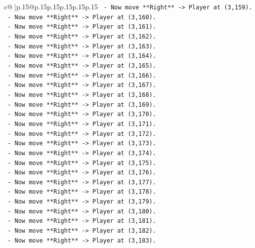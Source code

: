 \documentclass{article}
\begin{document}
{\begin{supertabular}{c@{$\;$}|p{.15\linewidth}@{}p{.15\linewidth}p{.15\linewidth}p{.15\linewidth}p{.15\linewidth}p{.15\linewidth}}
{{{\texttt{    {-}   Now move **Right** {-}> Player at (3,159).} \\
\texttt{    {-}   Now move **Right** {-}> Player at (3,160).} \\
\texttt{    {-}   Now move **Right** {-}> Player at (3,161).} \\
\texttt{    {-}   Now move **Right** {-}> Player at (3,162).} \\
\texttt{    {-}   Now move **Right** {-}> Player at (3,163).} \\
\texttt{    {-}   Now move **Right** {-}> Player at (3,164).} \\
\texttt{    {-}   Now move **Right** {-}> Player at (3,165).} \\
\texttt{    {-}   Now move **Right** {-}> Player at (3,166).} \\
\texttt{    {-}   Now move **Right** {-}> Player at (3,167).} \\
\texttt{    {-}   Now move **Right** {-}> Player at (3,168).} \\
\texttt{    {-}   Now move **Right** {-}> Player at (3,169).} \\
\texttt{    {-}   Now move **Right** {-}> Player at (3,170).} \\
\texttt{    {-}   Now move **Right** {-}> Player at (3,171).} \\
\texttt{    {-}   Now move **Right** {-}> Player at (3,172).} \\
\texttt{    {-}   Now move **Right** {-}> Player at (3,173).} \\
\texttt{    {-}   Now move **Right** {-}> Player at (3,174).} \\
\texttt{    {-}   Now move **Right** {-}> Player at (3,175).} \\
\texttt{    {-}   Now move **Right** {-}> Player at (3,176).} \\
\texttt{    {-}   Now move **Right** {-}> Player at (3,177).} \\
\texttt{    {-}   Now move **Right** {-}> Player at (3,178).} \\
\texttt{    {-}   Now move **Right** {-}> Player at (3,179).} \\
\texttt{    {-}   Now move **Right** {-}> Player at (3,180).} \\
\texttt{    {-}   Now move **Right** {-}> Player at (3,181).} \\
\texttt{    {-}   Now move **Right** {-}> Player at (3,182).} \\
\texttt{    {-}   Now move **Right** {-}> Player at (3,183).} \\
}}}
\end{supertabular}}
\end{document}
